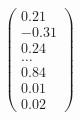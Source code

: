 \documentclass[preview]{standalone}
\begin{document}
\begin{align*}
\begin{pmatrix} 0.21 \\ -0.31 \\ 0.24 \\ \dots \\ 0.84 \\ 0.01 \\ 0.02 \end{pmatrix}
\end{align*}
\end{document}
